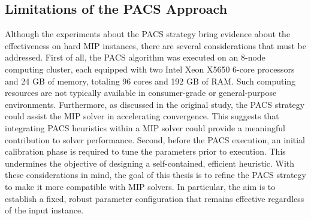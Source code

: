 \subsection{Limitations of the PACS Approach}\label{sec:lim_PACS}
Although the experiments about the PACS strategy bring evidence about the effectiveness on hard MIP instances, there are several considerations that must be addressed.
First of all, the PACS algorithm was executed on an 8-node computing cluster, each equipped with two Intel Xeon X5650 6-core processors and 24 GB of memory, totaling 96 cores and 192 GB of RAM. Such computing resources are not typically available in consumer-grade or general-purpose environments. Furthermore, as discussed in the original study, the PACS strategy could assist the MIP solver in accelerating convergence. This suggests that integrating PACS heuristics within a MIP solver could provide a meaningful contribution to solver performance. 
Second, before the PACS execution, an initial calibration phase is required to tune the parameters prior to execution. This undermines the objective of designing a self-contained, efficient heuristic.
With these considerations in mind, the goal of this thesis is to refine the PACS strategy to make it more compatible with MIP solvers. In particular, the aim is to establish a fixed, robust parameter configuration that remains effective regardless of the input instance.
